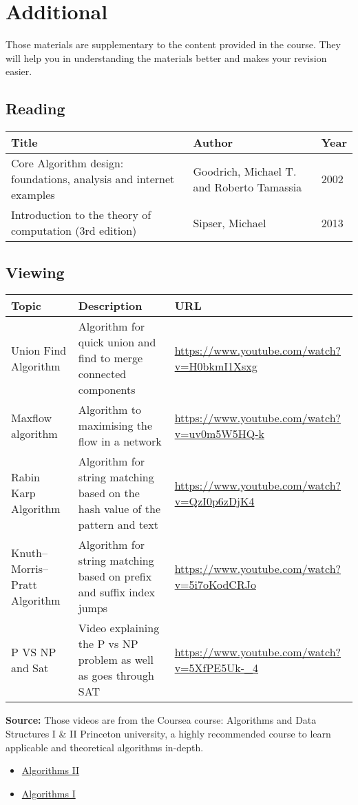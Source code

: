 \section*{Additional}
Those materials are supplementary to the content provided in the course. 
They will help you in understanding the materials better and makes your revision easier. 
\subsection*{Reading}
\begin{tabularx}{\textwidth} {|X|X|l|}
  \hline
  
  Title & Author & Year\\ \hline
    Core Algorithm design: foundations, analysis and internet examples &
    Goodrich, Michael T. and Roberto Tamassia &
    2002 \\ \hline
    Introduction to the theory of computation (3rd edition) &
    Sipser, Michael&
    2013\\ \hline
\end{tabularx}

\subsection*{Viewing}
\begin{tabularx}{\textwidth} {|X|X|l|}
  \hline
    Topic & Description & URL \\ \hline
    Union Find Algorithm &
    Algorithm for quick union and find to merge connected components &
    \url{https://www.youtube.com/watch?v=H0bkmI1Xsxg} \\ \hline
    Maxflow algorithm &
    Algorithm to maximising the flow in a network &
    \url{https://www.youtube.com/watch?v=uv0m5W5HQ-k}\\ \hline
    Rabin Karp Algorithm &
    Algorithm for string matching based on the hash value of the pattern and text &
    \url{https://www.youtube.com/watch?v=QzI0p6zDjK4} \\ \hline
    Knuth–Morris–Pratt Algorithm &
    Algorithm for string matching based on prefix and suffix index jumps &
    \url{https://www.youtube.com/watch?v=5i7oKodCRJo} \\ \hline
    P VS NP and Sat &
    Video explaining the P vs NP problem as well as goes through SAT &
    \url{https://www.youtube.com/watch?v=5XfPE5Uk-_4} \\ \hline
    \end{tabularx}
\textbf{Source: } Those videos are from the Coursea course: 
Algorithms and Data Structures I \& II Princeton university, 
a highly recommended course to learn applicable and theoretical algorithms in-depth.
\begin{itemize}
  \item \href{https://www.coursera.org/learn/algorithms-part2/}{Algorithms II}
  \item \href{https://www.coursera.org/learn/algorithms-part1/} {Algorithms I}
\end{itemize}
